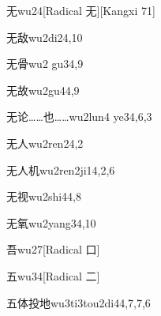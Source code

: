 \begin{entry}{无}{wu2}{4}[Radical 无][Kangxi 71]
\end{entry}

\begin{entry}{无敌}{wu2di2}{4,10}
\end{entry}

\begin{entry}{无骨}{wu2 gu3}{4,9}
\end{entry}

\begin{entry}{无故}{wu2gu4}{4,9}
\end{entry}

\begin{entry}{无论……也……}{wu2lun4 ye3}{4,6,3}
\end{entry}

\begin{entry}{无人}{wu2ren2}{4,2}
\end{entry}

\begin{entry}{无人机}{wu2ren2ji1}{4,2,6}
\end{entry}

\begin{entry}{无视}{wu2shi4}{4,8}
\end{entry}

\begin{entry}{无氧}{wu2yang3}{4,10}
\end{entry}

\begin{entry}{吾}{wu2}{7}[Radical 口]
\end{entry}

\begin{entry}{五}{wu3}{4}[Radical 二]
\end{entry}

\begin{entry}{五体投地}{wu3ti3tou2di4}{4,7,7,6}
\end{entry}

